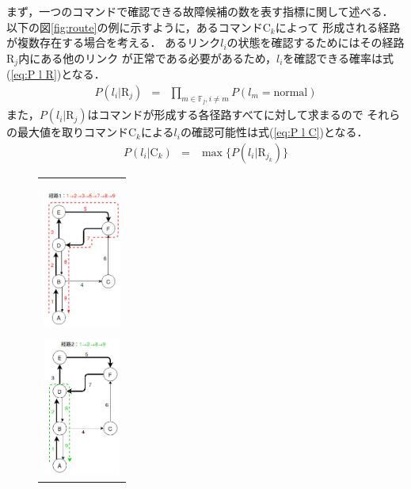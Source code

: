 \documentclass[11pt]{jsarticle}%
\begin{document}
\begin{multicols}{2}
 まず，一つのコマンドで確認できる故障候補の数を表す指標に関して述べる．
 以下の図\ref{fig:route}の例に示すように，あるコマンドC$_k$によって
 形成される経路が複数存在する場合を考える．%
 あるリンク$l_i$の状態を確認するためにはその経路$\text{R}_j$内にある他のリンク
 が正常である必要があるため，$l_i$を確認できる確率は式(\ref{eq:P l R})となる．
 \begin{eqnarray}
  P(l_{i} | \text{R}_j) &=& \prod_{m\in\mathbb{F}_j,i\neq m} P(l_{m} = \text{normal})
  \label{eq:P l R}
\end{eqnarray}
 また，$P(l_{i} | \text{R}_j)$はコマンドが形成する各径路すべてに対して求まるので
 それらの最大値を取りコマンドC$_k$による$l_i$の確認可能性は式(\ref{eq:P l C})となる．
\begin{eqnarray}
  P(l_i|\text{C}_k) &=& \max  \{ P(l_i|\text{R}_{j_k})\} \label{eq:P l C}
\end{eqnarray}
\vspace{-1zh}
\begin{figure}[H]
  \centering
     \begin{tabular}{c}
        \begin{minipage}{0.30\hsize}
        \centering
        \includegraphics[height=4.5cm]{../figure/route1.png}
           \label{fig:route1}
        \end{minipage}
        \begin{minipage}{0.30\hsize}
        \centering
        \includegraphics[height=4.5cm]{../figure/route2.png}

\end{minipage}
\end{tabular}
\end{figure}
\end{multicols}
\end{document}
